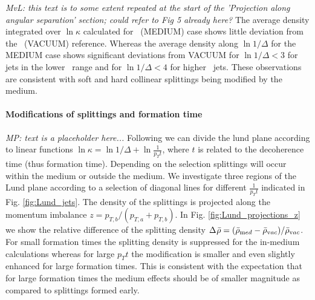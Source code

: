 \textit{MvL: this text is to some extent repeated at the start of the 'Projection along angular separation' section; could refer to Fig 5 already here?}
The average density integrated over $\ln \kappa$ calculated for \PbPb\ (MEDIUM) case shows little deviation from the \pp\ (VACUUM) reference.
Whereas the average density along $\ln 1/\Delta$ for the MEDIUM case shows significant deviations from VACUUM for $\ln 1/\Delta < 3$ for jets in the lower \pt\ range and for $\ln 1/\Delta < 4$ for higher \pt\ jets.
These observations are consistent with soft and hard collinear splittings being modified by the medium.

\paragraph{Modifications of splittings and formation time}

{\it MP: text is a placeholder here...}
Following \cite{Andrews:2018jcm} we can divide the lund plane according to linear functions $\ln\kappa = \ln1/\Delta + \ln \frac{1}{p_{T} t}$, where $t$ is related to the decoherence time (thus formation time).
Depending on the selection splittings will occur within the medium or outside the medium.
We investigate three regions of the Lund plane according to a selection of diagonal lines for different $\frac{1}{p_{T} t}$ indicated in Fig. \ref{fig:Lund_jets}.
The density of the splittings is projected along the momentum imbalance $z = p_{T,b}/(p_{T,a} + p_{T,b})$.
In Fig. \ref{fig:Lund_projections_z} we show the relative difference of the splitting density $\Delta_{\rm}\bar{\rho} = (\bar{\rho}_{\mathrm med} - \bar{\rho}_{\mathrm vac})/\bar{\rho}_{\mathrm vac}$.
For small formation times the splitting density is suppressed for the in-medium calculations whereas for large $p_{T} t$ the modification is smaller and even slightly enhanced for large formation times.
This is consistent with the expectation that for large formation times the medium effects should be of smaller magnitude as compared to splittings formed early.



